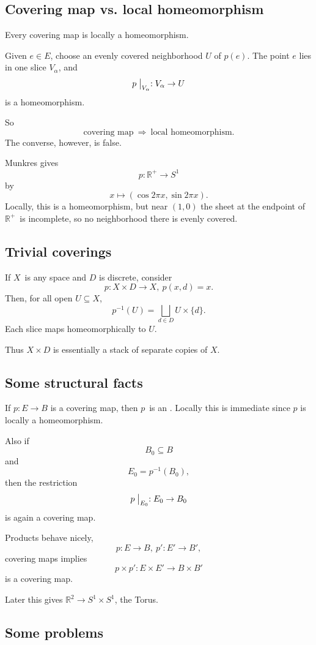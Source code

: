 \documentclass[11pt]{article}
\begin{document}
\subsection{Covering map vs. local homeomorphism}

Every covering map is locally a homeomorphism.

Given $e \in E$, choose an evenly covered neighborhood 
$U$ of $p(e)$. The point $e$ lies in one slice 
$V_\alpha$, and 
\[
    p\bigm|_{V_\alpha} : V_\alpha \to U
\]
is a homeomorphism.

So 
\[
    \text{covering map} \ \Rightarrow \ \text{local homeomorphism}.
\]
The converse, however, is false.

Munkres gives 
\[
    p:\mathbb R^+ \to S^1 
\]
by 
\[
    x \mapsto (\cos2\pi x, \sin2\pi x).
\]
Locally, this is a homeomorphism, but near $(1,0)$ the 
sheet at the endpoint of $\mathbb R^+$ is incomplete, 
so no neighborhood there is evenly covered. 

\subsection{Trivial coverings}

If $X$ is any space and $D$ is discrete, 
consider 
\[
    p : X \times D \to X, \ p(x,d) = x. 
\]
Then, for all open $U \subseteq X$, 
\[
    p^{-1}(U) = \bigsqcup_{d\in D}U \times \{d\}. 
\]
Each slice maps homeomorphically to $U$.

Thus $X \times D$ is essentially a stack of separate 
copies of $X$.

\subsection{Some structural facts}

If $p : E \to B$ is a covering map, then 
$p$ is an .
Locally this is immediate since $p$ is locally a homeomorphism.

Also if 
\[
    B_0 \subseteq B
\]
and 
\[
    E_0 = p^{-1}(B_0), 
\]
then the restriction 
\[
    p\bigm|_{E_0} : E_0 \to B_0
\]
is again a covering map.

Products behave nicely, 
\[
    p : E \to B, \ p' : E' \to B', 
\]
covering maps implies 
\[
    p \times p' : E \times E' \to B \times B' 
\]
is a covering map.

Later this gives $\mathbb R^2 \to S^1 \times S^1$, the 
Torus.

\subsection{Some problems}
\end{document}
